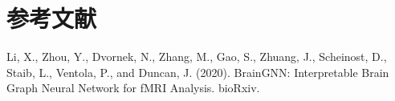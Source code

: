 \chapter*{参考文献}

Li, X., Zhou, Y., Dvornek, N., Zhang, M., Gao, S., Zhuang, J.,
Scheinost, D., Staib, L., Ventola, P., and Duncan, J. (2020).
BrainGNN: Interpretable Brain Graph Neural Network for fMRI Analysis.
bioRxiv.

